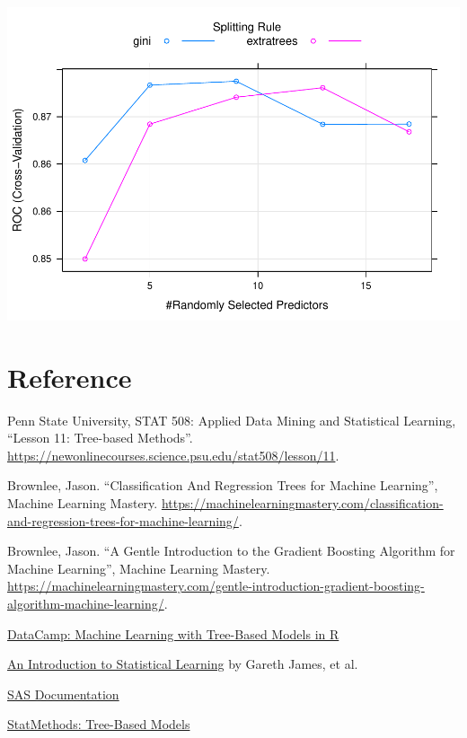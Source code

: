 \documentclass[
]{book}
\begin{document}
\includegraphics{data-sci_files/figure-latex/unnamed-chunk-115-1.pdf}

\hypertarget{reference}{%
\section{Reference}\label{reference}}

Penn State University, STAT 508: Applied Data Mining and Statistical Learning, ``Lesson 11: Tree-based Methods''. \url{https://newonlinecourses.science.psu.edu/stat508/lesson/11}.

Brownlee, Jason. ``Classification And Regression Trees for Machine Learning'', Machine Learning Mastery. \url{https://machinelearningmastery.com/classification-and-regression-trees-for-machine-learning/}.

Brownlee, Jason. ``A Gentle Introduction to the Gradient Boosting Algorithm for Machine Learning'', Machine Learning Mastery. \url{https://machinelearningmastery.com/gentle-introduction-gradient-boosting-algorithm-machine-learning/}.

\href{https://campus.datacamp.com/courses/machine-learning-with-tree-based-models-in-r}{DataCamp: Machine Learning with Tree-Based Models in R}

\href{http://faculty.marshall.usc.edu/gareth-james/ISL/}{An Introduction to Statistical Learning} by Gareth James, et al.

\href{http://support.sas.com/documentation/cdl/en/stathpug/68163/HTML/default/viewer.htm\#stathpug_hpsplit_details01.htm}{SAS Documentation}

\href{https://www.statmethods.net/advstats/cart.html}{StatMethods: Tree-Based Models}
\end{document}
